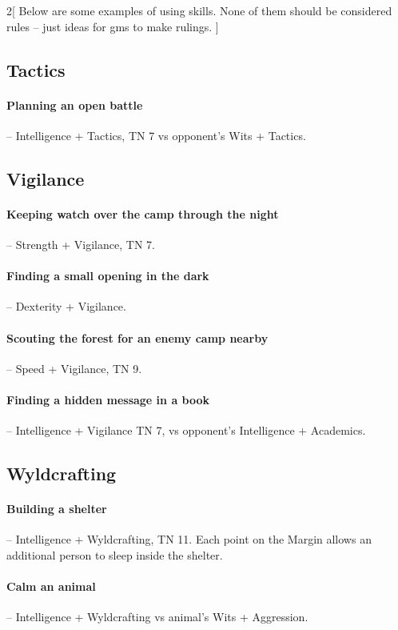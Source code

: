 \begin{multicols}{2}[
  Below are some examples of using skills.
  None of them should be considered rules -- just ideas for \glspl{gm} to make rulings.
]
\begin{figure*}[t]
\end{figure*}

\subsection{Tactics}

\paragraph{Planning an open battle} -- Intelligence + Tactics, TN 7 vs opponent's Wits + Tactics.

\subsection{Vigilance}

\paragraph{Keeping watch over the camp through the night} -- Strength + Vigilance, TN 7.

\paragraph{Finding a small opening in the dark} -- Dexterity + Vigilance.

\paragraph{Scouting the forest for an enemy camp nearby} -- Speed + Vigilance, TN 9.

\paragraph{Finding a hidden message in a book} -- Intelligence + Vigilance TN 7, vs opponent's Intelligence + Academics.

\subsection{Wyldcrafting}

\paragraph{Building a shelter} -- Intelligence + Wyldcrafting, TN 11.
Each point on the Margin allows an additional person to sleep inside the shelter.

\paragraph{Calm an animal} -- Intelligence + Wyldcrafting vs animal's Wits + Aggression.


\end{multicols}
